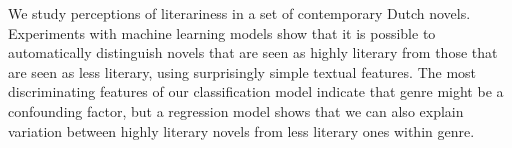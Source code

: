 We study perceptions of literariness in a set of contemporary Dutch novels. Experiments with machine learning models show that it is possible to automatically distinguish novels that are seen as highly literary from those that are seen as less literary, using surprisingly simple textual features. The most discriminating features of our classification model indicate that genre might be a confounding factor, but a regression model shows that we can also explain variation between highly literary novels from less literary ones within genre.
